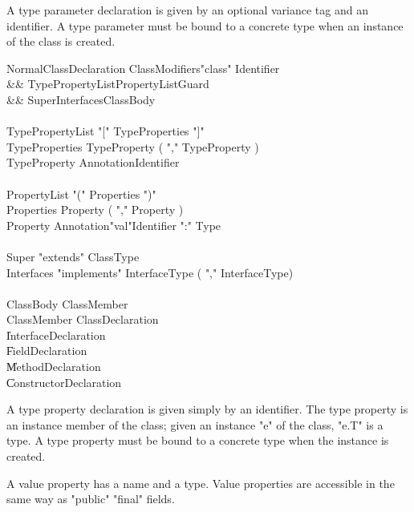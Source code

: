 A type parameter declaration is given by an optional variance
tag and an identifier.
A type parameter must be
bound to a concrete type when an instance of the class is created.

\else

\begin{grammar}
NormalClassDeclaration \:
      ClassModifiers\opt \xcd"class" Identifier  \\
   && TypePropertyList\opt PropertyList\opt Guard\opt \\
   && Super\opt Interfaces\opt ClassBody \\
\\
TypePropertyList     \:  \xcd"[" TypeProperties \xcd"]" \\
TypeProperties       \:  TypeProperty ( \xcd"," TypeProperty )\star \\
TypeProperty         \:  Annotation\star Identifier     \\
\\
PropertyList     \:  \xcd"(" Properties \xcd")" \\
Properties       \:  Property ( \xcd"," Property )\star \\
Property         \:  Annotation\star \xcd"val"\opt Identifier \xcd":" Type \\
\\
Super \: \xcd"extends" ClassType \\
Interfaces \: \xcd"implements" InterfaceType ( \xcd"," InterfaceType)\star \\
\\
ClassBody \: ClassMember\star \\
ClassMember \: ClassDeclaration \\
            \| InterfaceDeclaration \\
            \| FieldDeclaration \\
            \| MethodDeclaration \\
            \| ConstructorDeclaration \\
\end{grammar}

A type property declaration is given simply by an identifier.
The type property is an instance member of the class; given
an instance \xcd"e" of the class, \xcd"e.T" is a type.
A type property must be
bound to a concrete type when the instance is created.

\fi


A value property has a name and a type.   Value properties
are accessible in the same way as \xcd"public" \xcd"final"
fields.

